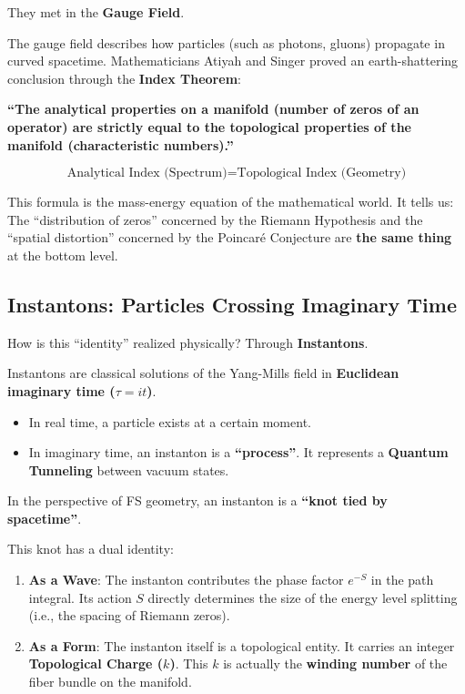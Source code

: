 They met in the \textbf{Gauge Field}.

The gauge field describes how particles (such as photons, gluons) propagate in curved spacetime. Mathematicians Atiyah and Singer proved an earth-shattering conclusion through the \textbf{Index Theorem}:

\textbf{``The analytical properties on a manifold (number of zeros of an operator) are strictly equal to the topological properties of the manifold (characteristic numbers).''}

$$\text{Analytical Index (Spectrum)} = \text{Topological Index (Geometry)}$$

This formula is the mass-energy equation of the mathematical world. It tells us: The ``distribution of zeros'' concerned by the Riemann Hypothesis and the ``spatial distortion'' concerned by the Poincaré Conjecture are \textbf{the same thing} at the bottom level.

\subsection{Instantons: Particles Crossing Imaginary Time}

How is this ``identity'' realized physically? Through \textbf{Instantons}.

Instantons are classical solutions of the Yang-Mills field in \textbf{Euclidean imaginary time ($\tau = it$)}.

\begin{itemize}
\item In real time, a particle exists at a certain moment.

\item In imaginary time, an instanton is a \textbf{``process''}. It represents a \textbf{Quantum Tunneling} between vacuum states.
\end{itemize}

In the perspective of FS geometry, an instanton is a \textbf{``knot tied by spacetime''}.

This knot has a dual identity:

\begin{enumerate}
\item \textbf{As a Wave}: The instanton contributes the phase factor $e^{-S}$ in the path integral. Its action $S$ directly determines the size of the energy level splitting (i.e., the spacing of Riemann zeros).

\item \textbf{As a Form}: The instanton itself is a topological entity. It carries an integer \textbf{Topological Charge ($k$)}. This $k$ is actually the \textbf{winding number} of the fiber bundle on the manifold.
\end{enumerate}

